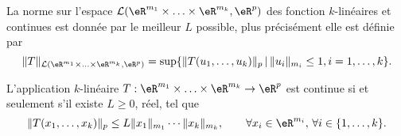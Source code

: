\begin{definition}
	La norme sur l'espace $\mathcal{L}(\eR^{m_1}\times \ldots \times\eR^{m_k}, \eR^p)$ des fonction $k$-linéaires et continues est donnée par le meilleur $L$ possible, plus précisément elle est  définie par 
	\begin{equation}
		\|T\|_{\mathcal{L}(\eR^{m_1}\times \ldots \times\eR^{m_k}, \eR^p)}=\sup\{ \|T(u_1, \ldots,u_k)\|_p\,\vert\,\|u_i\|_{m_i}\leq 1, i=1,\ldots, k \}.
	\end{equation}
\end{definition}

\begin{proposition}
  L'application $k$-linéaire  $T: \eR^{m_1}\times \ldots \times\eR^{m_k}\to\eR^p $ est continue si et seulement s'il existe $L\geq 0$, réel, tel que
  \begin{equation}\label{limitatezza}
     \|T(x_1, \ldots,x_k)\|_p\leq L \|x_1\|_{m_1}\cdots\|x_k\|_{m_k}, \qquad \forall x_i\in\eR^{m_i},\,\forall i \in \{1,\ldots, k\}.
  \end{equation}
\end{proposition}

